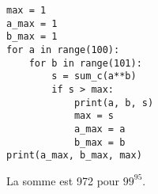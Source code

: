 \begin{Answer}
\begin{lstlisting}
max = 1
a_max = 1
b_max = 1
for a in range(100):
    for b in range(101):
        s = sum_c(a**b)
        if s > max:
            print(a, b, s)
            max = s
            a_max = a
            b_max = b
print(a_max, b_max, max)
\end{lstlisting}
La somme est 972 pour $99^{95}$.
\end{Answer}
